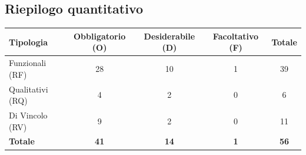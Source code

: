 \subsection{Riepilogo quantitativo}
\begin{center}
\vspace{-5pt}
\label{tab:riepilogo_requisiti}
\begin{tabular}{l c c c c}
\toprule
\textbf{Tipologia} & \textbf{Obbligatorio (O)} & \textbf{Desiderabile (D)} & \textbf{Facoltativo (F)} & \textbf{Totale} \\
\midrule
Funzionali (RF) & 28 & 10 & 1 & 39 \\
Qualitativi (RQ) & 4 & 2 & 0 & 6 \\
Di Vincolo (RV) & 9 & 2 & 0 & 11 \\
\midrule
\textbf{Totale} & \textbf{41} & \textbf{14} & \textbf{1} & \textbf{56} \\
\bottomrule
\end{tabular}
\end{center}

